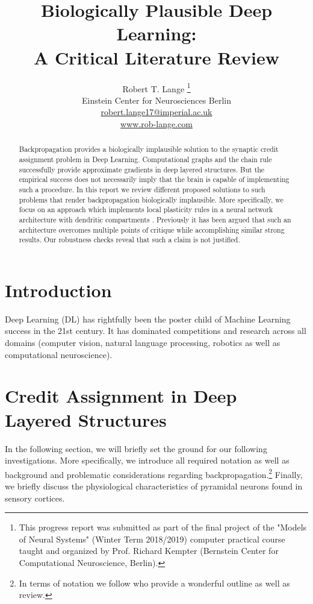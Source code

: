 \documentclass{article}
\title{Biologically Plausible Deep Learning: \\
		A Critical Literature Review}
\author{
  Robert T. Lange \thanks{This progress report was submitted as part of the final project of the "Models of Neural Systems" (Winter Term 2018/2019) computer practical course taught and organized by Prof. Richard Kempter (Bernstein Center for Computational Neuroscience, Berlin).} \\
  Einstein Center for Neurosciences Berlin\\
  \url{robert.lange17@imperial.ac.uk} \\
  \url{www.rob-lange.com} \\
}
\theoremstyle{definition}
\begin{document}
\maketitle


\begin{abstract}
Backpropagation provides a biologically implausible solution to the synaptic credit assignment problem in Deep Learning. Computational graphs and the chain rule successfully provide approximate gradients in deep layered structures. But the empirical success does not necessarily imply that the brain is capable of implementing such a procedure. 
In this report we review different proposed solutions to such problems that render backpropagation biologically implausible. More specifically, we focus on an approach which implements local plasticity rules in a neural network architecture with dendritic compartments \citep{guerguiev2017}.
Previously it has been argued that such an architecture overcomes multiple points of critique while accomplishing similar strong results. Our robustness checks reveal that such a claim is not justified. 
\end{abstract}

\section{Introduction}

Deep Learning (DL) has rightfully been the poster child of Machine Learning success in the 21st century. It has dominated competitions and research across all domains (computer vision, natural language processing, robotics as well as computational neuroscience). 

\newpage
\section{Credit Assignment in Deep Layered Structures}

In the following section, we will briefly set the ground for our following investigations. More specifically, we introduce all required notation as well as background and problematic considerations regarding backpropagation.\footnote{In terms of notation we follow \citet{bartunov2018} who provide a wonderful outline as well as review.} Finally, we briefly discuss the physiological characteristics of pyramidal neurons found in sensory cortices. 
\end{document}
